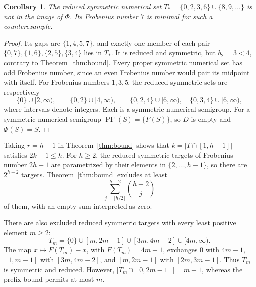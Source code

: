 \documentclass[11pt,a4paper]{article}
\newtheorem{corollary}[theorem]{Corollary}
\theoremstyle{definition}
\theoremstyle{remark}
\newcommand{\PF}{\operatorname{PF}}
\begin{document}
\begin{corollary}\label{cor:example}
The reduced symmetric numerical set
$T_* = \{0,2,3,6\}\cup\{8,9,\ldots\}$ is not in the image of $\Phi$.
Its Frobenius number $7$ is minimal for such a counterexample.
\end{corollary}
\begin{proof}
Its gaps are $\{1,4,5,7\}$, and exactly one member of each pair
$\{0,7\},\{1,6\},\{2,5\},\{3,4\}$ lies in $T_*$.
It is reduced and symmetric, but $b_2=3<4$,
contrary to Theorem~\ref{thm:bound}.
Every proper symmetric numerical set has odd Frobenius number, since an even
Frobenius number would pair its midpoint with itself.
For Frobenius numbers $1,3,5$, the reduced symmetric sets are respectively
\[
 \{0\}\cup[2,\infty),\qquad
 \{0,2\}\cup[4,\infty),\qquad
 \{0,2,4\}\cup[6,\infty),\quad
 \{0,3,4\}\cup[6,\infty),
\]
where intervals denote integers. Each is a symmetric numerical semigroup.
For a symmetric numerical semigroup $\PF(S)=\{F(S)\}$,
so $D$ is empty and $\Phi(S)=S$.
\end{proof}

Taking $r=h-1$ in Theorem~\ref{thm:bound} shows that
$k=|T\cap[1,h-1]|$ satisfies $2k+1\leq h$.
For $h\geq2$, the reduced symmetric targets of Frobenius number $2h-1$
are parametrized by their elements in $\{2,\ldots,h-1\}$,
so there are $2^{h-2}$ targets. Theorem~\ref{thm:bound} excludes at least
\[
 \sum_{j=\lceil h/2\rceil}^{h-2}\binom{h-2}{j}
\]
of them, with an empty sum interpreted as zero.

There are also excluded reduced symmetric targets with every least positive
element $m\geq2$:
\[
 T_m=\{0\}\cup[m,2m-1]\cup[3m,4m-2]\cup[4m,\infty).
\]
The map $x\mapsto F(T_m)-x$, with $F(T_m)=4m-1$, exchanges $0$ with $4m-1$,
$[1,m-1]$ with $[3m,4m-2]$, and $[m,2m-1]$ with $[2m,3m-1]$.
Thus $T_m$ is symmetric and reduced. However,
$|T_m\cap[0,2m-1]|=m+1$, whereas the prefix bound permits at most $m$.
\end{document}
